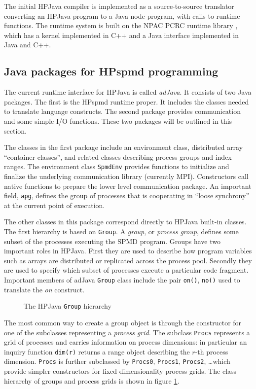 The initial HPJava compiler is implemented as a source-to-source
translator converting an HPJava program to a Java node program, with
calls to runtime functions.  The runtime system is built on the NPAC
PCRC runtime library \cite{NPAC_PCRC_kernel}, which has a kernel
implemented in C++ and a Java interface implemented in Java and C++.

\subsection{Java packages for HPspmd programming}
\label{sec:package}

The current runtime interface for HPJava is called \emph{adJava}.  It
consists of two Java packages.  The first is the HPspmd runtime
proper.  It includes the classes needed to translate language
constructs.  The second package provides communication and some simple
I/O functions.  These two packages will be outlined in this section.

The classes in the first package include an environment class, distributed
array ``container classes'', and related classes describing process groups
and index ranges.
The environment class {\tt SpmdEnv} provides functions to initialize and
finalize the underlying communication library (currently MPI).
Constructors call native functions to prepare the lower
level communication package.  An important field, {\tt apg},
defines the group of processes that is cooperating in ``loose
synchrony'' at the current point of execution.

The other classes in this package correspond directly to HPJava built-in
classes.  The first hierarchy is based on \texttt{Group}.
A {\em group}, or {\em process group}, defines some subset of the
processes executing the SPMD program.  Groups have two important roles
in HPJava.  First they are used to describe how program variables such as
arrays are distributed or replicated across the process pool.  Secondly
they are used to specify which subset of processes execute a particular
code fragment.
Important members of adJava {\tt Group} class include the pair
{\tt on()}, {\tt no()} used to translate the {\em on} construct.
\begin{figure}[htb]
  \begin{center}
    \leavevmode
    \caption{The HPJava {\tt Group} hierarchy}
    \label{fig:procs}
  \end{center}
\end{figure}
The most common way to create a group object is through
the constructor for one of the subclasses representing a {\em process
grid}.  The subclass
\texttt{Procs} represents a grid of processes and carries
information on process dimensions: in particular an inquiry function
{\tt dim(r)} returns a range object describing the $r$-th process
dimension.  {\tt Procs} is further subclassed by \texttt{Procs0},
\texttt{Procs1}, \texttt{Procs2}, \ldots which  provide simpler
constructors for fixed dimensionality process grids.
The class hierarchy of groups and process grids is shown
in figure \ref{fig:procs}.


